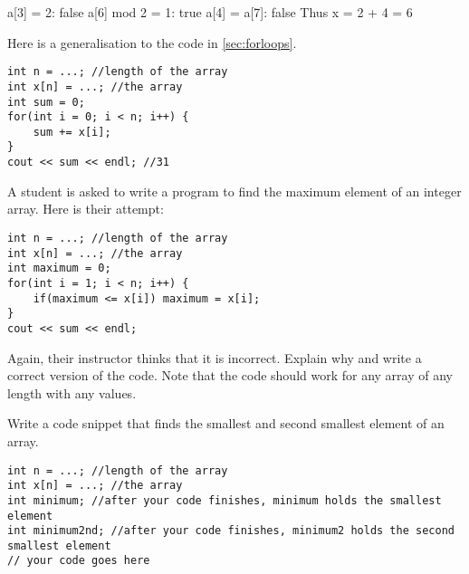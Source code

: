\begin{questions}
{a[3] = 2: false
a[6] mod 2 = 1: true
a[4] = a[7]: false
Thus x = 2 + 4 = 6
}

\miquestion Here is a generalisation to the code in \cref{sec:forloops}.

\begin{lstlisting}
int n = ...; //length of the array
int x[n] = ...; //the array
int sum = 0;
for(int i = 0; i < n; i++) { 
    sum += x[i];
}
cout << sum << endl; //31
\end{lstlisting}


\label{q:sumx0}

\miquestion A student is asked to write a program to find the maximum element of an integer array. Here is their attempt:

\begin{lstlisting}
int n = ...; //length of the array
int x[n] = ...; //the array
int maximum = 0;
for(int i = 1; i < n; i++) {
    if(maximum <= x[i]) maximum = x[i];
}
cout << sum << endl; 
\end{lstlisting}

Again, their instructor thinks that it is incorrect. Explain why and write a correct version of the code. Note that the code should work for any array  of any length with any values. 

\miquestion Write a code snippet that finds the smallest and second smallest element of an array.

\begin{lstlisting}
int n = ...; //length of the array
int x[n] = ...; //the array
int minimum; //after your code finishes, minimum holds the smallest element
int minimum2nd; //after your code finishes, minimum2 holds the second smallest element
// your code goes here
\end{lstlisting}


\end{questions}
